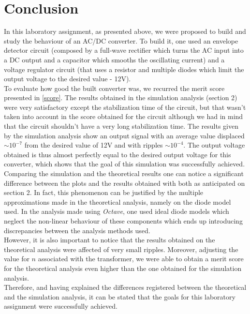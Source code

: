 \section{Conclusion}
In this laboratory assignment, as presented above, we were proposed to build and study the behaviour of an AC/DC converter. To build it, one used an envelope detector circuit (composed by a full-wave rectifier which turns the AC input into a DC output and a capacitor which smooths the oscillating current) and a voltage regulator circuit (that uses a resistor and multiple diodes which limit the output voltage to the desired value - 12V).\\

To evaluate how good the built converter was, we recurred the merit score presented in \eqref{score}. The results obtained in the simulation analysis (section 2) were very satisfactory except the stabilization time of the circuit, but that wasn't taken into account in the score obtained for the circuit although we had in mind that the circuit shouldn't have a very long stabilization time. The results given by the simulation analysis show an output signal with an average value displaced $\sim 10^{-7}$ from the desired value of 12V and with ripples $\sim 10^{-4}$. The output voltage obtained is thus almost perfectly equal to the desired output voltage for this converter, which shows that the goal of this simulation was successfully achieved.\\

Comparing the simulation and the theoretical results one can notice a significant difference between the plots and the results obtained with both as anticipated on section 2. In fact, this phenomenon can be justified by the multiple approximations made in the theoretical analysis, namely on the diode model used. In the analysis made using \textit{Octave}, one used ideal diode models which neglect the non-linear behaviour of these components which ends up introducing discrepancies between the analysis methods used.\\

However, it is also important to notice that the results obtained on the theoretical analysis were affected of very small ripples. Moreover, adjusting the value for $n$ associated with the transformer, we were able to obtain a merit score for the theoretical analysis even higher than the one obtained for the simulation analysis.\\

Therefore, and having explained the differences registered between the theoretical and the simulation analysis, it can be stated that the goals for this laboratory assignment were successfully achieved.